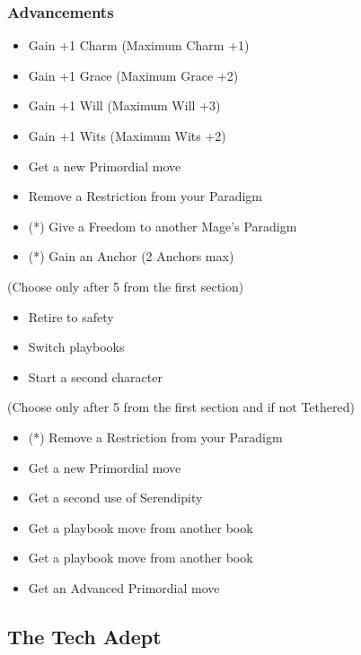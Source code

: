 \documentclass[
]{article}
\providecommand{\tightlist}{%
  \setlength{\itemsep}{0pt}\setlength{\parskip}{0pt}}
\begin{document}
\hypertarget{advancements-5}{%
\subsubsection{Advancements}\label{advancements-5}}

\begin{itemize}
\tightlist
\item
  Gain +1 Charm (Maximum Charm +1)
\item
  Gain +1 Grace (Maximum Grace +2)
\item
  Gain +1 Will (Maximum Will +3)
\item
  Gain +1 Wits (Maximum Wits +2)
\item
  Get a new Primordial move
\item
  Remove a Restriction from your Paradigm
\item
  (*) Give a Freedom to another Mage's Paradigm
\item
  (*) Gain an Anchor (2 Anchors max)
\end{itemize}

(Choose only after 5 from the first section)

\begin{itemize}
\tightlist
\item
  Retire to safety
\item
  Switch playbooks
\item
  Start a second character
\end{itemize}

(Choose only after 5 from the first section and if not Tethered)

\begin{itemize}
\tightlist
\item
  (*) Remove a Restriction from your Paradigm
\item
  Get a new Primordial move
\item
  Get a second use of Serendipity
\item
  Get a playbook move from another book
\item
  Get a playbook move from another book
\item
  Get an Advanced Primordial move
\end{itemize}

\newpage

\hypertarget{the-tech-adept}{%
\subsection{The Tech Adept}\label{the-tech-adept}}
\end{document}

